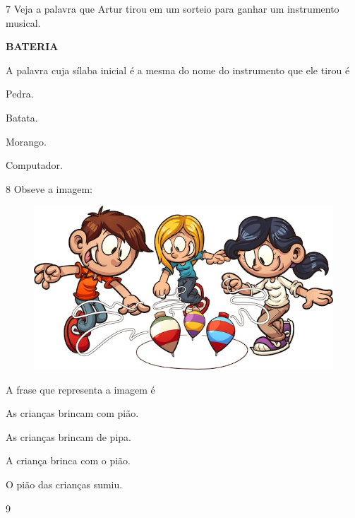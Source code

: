 \num{7} Veja a palavra que Artur tirou em um sorteio para ganhar um instrumento musical.

\begin{myquote}
\textbf{BATERIA}
\end{myquote}

A palavra cuja sílaba inicial é a mesma do nome do instrumento que ele tirou é

\begin{multicols}{2}
\begin{escolha}
\item Pedra.

\item Batata.

\item Morango.

\item Computador.
\end{escolha}
\end{multicols}

\num{8} Obseve a imagem:

\begin{figure}[htpb!]
\centering
\includegraphics[width=.5\textwidth]{media/image144.jpeg}
\end{figure}


A frase que representa a imagem é

\begin{escolha}
\item As crianças brincam com pião.

\item As crianças brincam de pipa.

\item A criança brinca com o pião.

\item O pião das crianças sumiu.
\end{escolha}

\pagebreak
\num{9}

